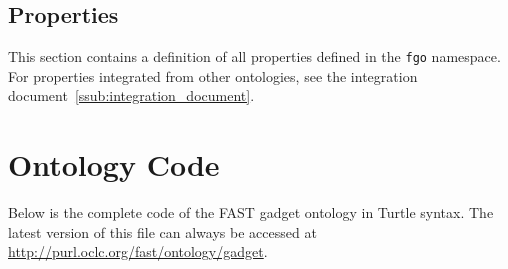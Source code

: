 \documentclass[twoside]{fast_latex}
\begin{document}
\singlespacing
\begin{small}

\end{small}
\doublespacing


\subsection{Properties} %
\label{sub:properties}

This section contains a definition of all properties defined in the \texttt{fgo} namespace. For properties integrated from other ontologies, see the integration document~\ref{ssub:integration_document}.

\singlespacing
\begin{small}

\end{small}
\doublespacing



\clearpage
{}
\section{Ontology Code}
\label{sec:ontology_code}

Below is the complete code of the FAST gadget ontology in Turtle syntax. The latest version of this file can always be accessed at \url{http://purl.oclc.org/fast/ontology/gadget}.

\singlespacing
% 


\clearpage
{}


\end{document}
